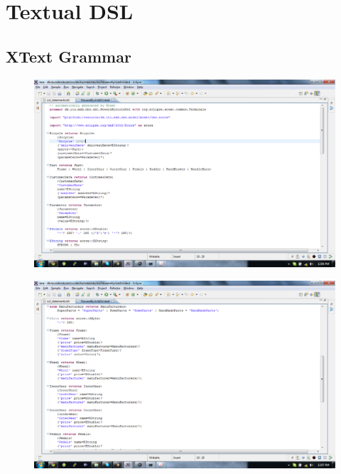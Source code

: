 \section{Textual DSL}
\label{appendix.xtext}

\subsection{XText Grammar}

\begin{figure}[H]
    \begin{center}
        \includegraphics[width=\textwidth]{fig/xtext/grammar_1.pdf}
    \end{center}
\end{figure}

\begin{figure}[H]
    \begin{center}
        \includegraphics[width=\textwidth]{fig/xtext/grammar_2.pdf}
    \end{center}
\end{figure}

